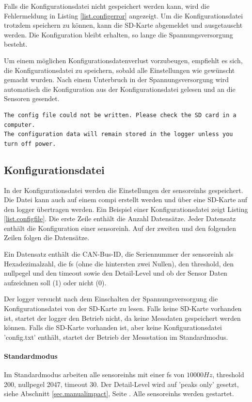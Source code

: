 Falls die Konfigurationsdatei nicht gespeichert werden kann, wird die Fehlermeldung in Listing \ref{list.configerror} angezeigt. Um die Konfigurationsdatei trotzdem speichern zu können, kann die SD-Karte abgemeldet und ausgetauscht werden. Die Konfiguration bleibt erhalten, so lange die Spannungsversorgung besteht.

Um einem möglichen Konfigurationsdatenverlust vorzubeugen, empfiehlt es sich, die Konfigurationsdatei zu speichern, sobald alle Einstellungen wie gewünscht gemacht wurden. Nach einem Unterbruch in der Spannungsversorgung wird automatisch die Konfiguration aus der Konfigurationsdatei gelesen und an die Sensoren gesendet.

\begin{lstlisting}[caption=Fehlermeldung beim Speichern der Konfigurationsdatei, label=list.configerror]
The config file could not be written. Please check the SD card in a computer.
The configuration data will remain stored in the logger unless you turn off power.
\end{lstlisting}

\subsection{Konfigurationsdatei}
In der Konfigurationsdatei werden die Einstellungen der \glspl{sensoreinh} gespeichert. Die Datei kann auch auf einem \gls{compi} erstellt werden und über eine SD-Karte auf den \gls{logger} übertragen werden. Ein Beispiel einer Konfigurationsdatei zeigt Listing \ref{list.configfile}. Die erste Zeile enthält die Anzahl Datensätze. Jeder Datensatz enthält die Konfiguration einer \gls{sensoreinh}. Auf der zweiten und den folgenden Zeilen folgen die Datensätze. 

Ein Datensatz enthält die CAN-Bus-ID, die Seriennummer der \gls{sensoreinh} als Hexadezimalzahl, die \gls{fs} (ohne die hintersten zwei Nullen), den \gls{threshold}, den \gls{nullpegel} und den \gls{timeout} sowie den Detail-Level und ob der Sensor Daten aufzeichnen soll (1) oder nicht (0).

Der \gls{logger} versucht nach dem Einschalten der Spannungsversorgung die Konfigurationsdatei von der SD-Karte zu lesen. Falls keine SD-Karte vorhanden ist, startet der \gls{logger} den Betrieb nicht, da keine Messdaten gespeichert werden können. Falls die SD-Karte vorhanden ist, aber keine Konfigurationsdatei 'config.txt' enthält, startet der Betrieb der Messstation im Standardmodus.

\paragraph{Standardmodus} Im Standardmodus arbeiten alle \glspl{sensoreinh} mit einer \gls{fs} von \ensuremath{10000 Hz}, \gls{threshold} 200, \gls{nullpegel} 2047, \gls{timeout} 30. Der Detail-Level wird auf 'peaks only' gesetzt, siehe Abschnitt \ref{sec.manualimpact}, Seite \pageref{sec.manualimpact}. Alle \glspl{sensoreinh} werden gestartet.

